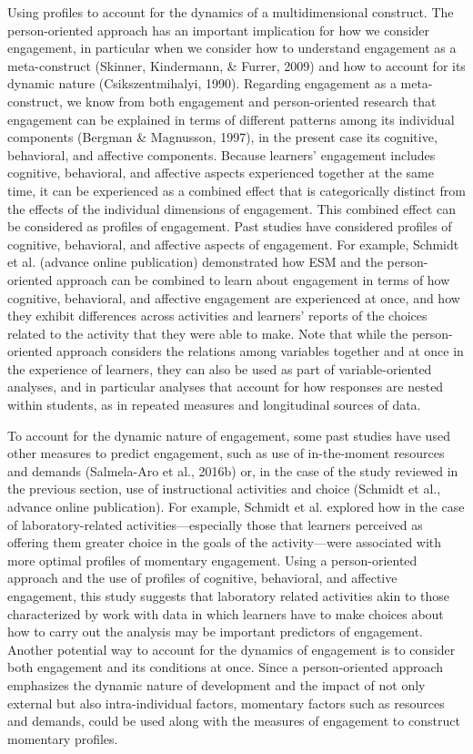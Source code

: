 \documentclass[]{book}
\theoremstyle{definition}
\theoremstyle{definition}
\theoremstyle{definition}
\theoremstyle{remark}
\begin{document}
Using profiles to account for the dynamics of a multidimensional
construct. The person-oriented approach has an important implication for
how we consider engagement, in particular when we consider how to
understand engagement as a meta-construct (Skinner, Kindermann, \&
Furrer, 2009) and how to account for its dynamic nature
(Csikszentmihalyi, 1990). Regarding engagement as a meta-construct, we
know from both engagement and person-oriented research that engagement
can be explained in terms of different patterns among its individual
components (Bergman \& Magnusson, 1997), in the present case its
cognitive, behavioral, and affective components. Because learners'
engagement includes cognitive, behavioral, and affective aspects
experienced together at the same time, it can be experienced as a
combined effect that is categorically distinct from the effects of the
individual dimensions of engagement. This combined effect can be
considered as profiles of engagement. Past studies have considered
profiles of cognitive, behavioral, and affective aspects of engagement.
For example, Schmidt et al. (advance online publication) demonstrated
how ESM and the person-oriented approach can be combined to learn about
engagement in terms of how cognitive, behavioral, and affective
engagement are experienced at once, and how they exhibit differences
across activities and learners' reports of the choices related to the
activity that they were able to make. Note that while the
person-oriented approach considers the relations among variables
together and at once in the experience of learners, they can also be
used as part of variable-oriented analyses, and in particular analyses
that account for how responses are nested within students, as in
repeated measures and longitudinal sources of data.

To account for the dynamic nature of engagement, some past studies have
used other measures to predict engagement, such as use of in-the-moment
resources and demands (Salmela-Aro et al., 2016b) or, in the case of the
study reviewed in the previous section, use of instructional activities
and choice (Schmidt et al., advance online publication). For example,
Schmidt et al. explored how in the case of laboratory-related
activities---especially those that learners perceived as offering them
greater choice in the goals of the activity---were associated with more
optimal profiles of momentary engagement. Using a person-oriented
approach and the use of profiles of cognitive, behavioral, and affective
engagement, this study suggests that laboratory related activities akin
to those characterized by work with data in which learners have to make
choices about how to carry out the analysis may be important predictors
of engagement. Another potential way to account for the dynamics of
engagement is to consider both engagement and its conditions at once.
Since a person-oriented approach emphasizes the dynamic nature of
development and the impact of not only external but also
intra-individual factors, momentary factors such as resources and
demands, could be used along with the measures of engagement to
construct momentary profiles.
\end{document}
